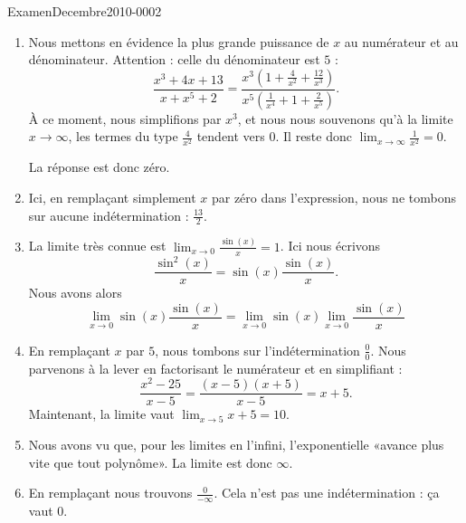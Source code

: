 
\begin{corrige}{ExamenDecembre2010-0002}

	\begin{enumerate}
		\item
			Nous mettons en évidence la plus grande puissance de $x$ au numérateur et au dénominateur. Attention : celle du dénominateur est $5$ :
			\begin{equation}
				\frac{ x^3+4x+13 }{ x+x^5+2 }=\frac{ x^3\left( 1+\frac{ 4 }{ x^2 }+\frac{ 12 }{ x^3 } \right) }{ x^5\left( \frac{1}{ x^4 }+1+\frac{ 2 }{ x^5 } \right) }.
			\end{equation}
			À ce moment, nous simplifions par $x^3$, et nous nous souvenons qu'à la limite $x\to\infty$, les termes du type $\frac{ 4 }{ x^2 }$ tendent vers $0$. Il reste donc $\lim_{x\to \infty} \frac{1}{ x^2 }=0$.

			La réponse est donc zéro.

		\item
			Ici, en remplaçant simplement $x$ par zéro dans l'expression, nous ne tombons sur aucune indétermination : $\frac{ 13 }{2}$.
		\item
			La limite très connue est $\lim_{x\to 0} \frac{ \sin(x) }{ x }=1$. Ici nous écrivons
			\begin{equation}
				\frac{ \sin^2(x) }{ x }=\sin(x)\frac{ \sin(x) }{ x }.
			\end{equation}
			Nous avons alors
			\begin{equation}
				\lim_{x\to 0} \sin(x)\frac{ \sin(x) }{ x }=\lim_{x\to 0} \sin(x)\lim_{x\to 0} \frac{ \sin(x) }{ x }
			\end{equation}
		\item
			En remplaçant $x$ par $5$, nous tombons sur l'indétermination $\frac{ 0 }{ 0 }$. Nous parvenons à la lever en factorisant le numérateur et en simplifiant :
			\begin{equation}
				\frac{ x^2-25 }{ x-5 }=\frac{(x-5)(x+5) }{ x-5 }=x+5.
			\end{equation}
			Maintenant, la limite vaut $\lim_{x\to 5} x+5=10$.
		\item
			Nous avons vu que, pour les limites en l'infini, l'exponentielle «avance plus vite que tout polynôme». La limite est donc $\infty$.
		\item
			En remplaçant nous trouvons $\frac{ 0 }{ -\infty }$. Cela n'est pas une indétermination : ça vaut $0$.
	\end{enumerate}

\end{corrige}
